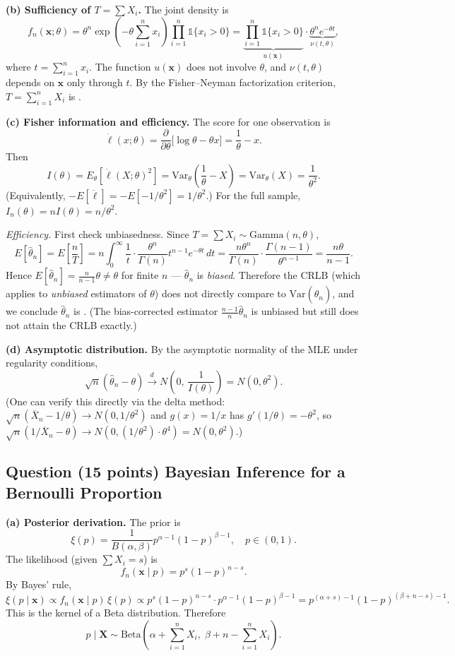 \documentclass[11pt]{article}
\newcounter{qnum}
\newcommand{\question}[2]{\stepcounter{qnum}\subsection*{Question \theqnum \quad (#1 points) \hfill #2}}
\begin{document}
\textbf{(b) Sufficiency of $T = \sum X_i$.} The joint density is
\[ f_n(\mathbf{x};\theta) = \theta^n \exp\!\left(-\theta\sum_{i=1}^n x_i\right)\prod_{i=1}^n \mathbb{1}\{x_i > 0\}
= \underbrace{\prod_{i=1}^n \mathbb{1}\{x_i > 0\}}_{u(\mathbf{x})} \cdot \underbrace{\theta^n e^{-\theta t}}_{\nu(t,\theta)}, \]
where $t = \sum_{i=1}^n x_i$. The function $u(\mathbf{x})$ does not involve $\theta$, and $\nu(t,\theta)$ depends on $\mathbf{x}$ only through $t$. By the Fisher--Neyman factorization criterion, $T = \sum_{i=1}^n X_i$ is .

\textbf{(c) Fisher information and efficiency.} The score for one observation is
\[ \dot\ell(x;\theta) = \frac{\partial}{\partial\theta}\bigl[\log\theta - \theta x\bigr] = \frac{1}{\theta} - x. \]
Then
\[ I(\theta) = E_\theta[\dot\ell(X;\theta)^2] = \mathrm{Var}_\theta\!\left(\frac{1}{\theta} - X\right) = \mathrm{Var}_\theta(X) = \frac{1}{\theta^2}. \]
(Equivalently, $-E[\ddot\ell] = -E[-1/\theta^2] = 1/\theta^2$.) For the full sample, $I_n(\theta) = n I(\theta) = \boxed{n/\theta^2}$.

\emph{Efficiency.} First check unbiasedness. Since $T = \sum X_i \sim \mathrm{Gamma}(n,\theta)$,
\[ E[\hat\theta_n] = E\!\left[\frac{n}{T}\right] = n \int_0^\infty \frac{1}{t} \cdot \frac{\theta^n}{\Gamma(n)} t^{n-1} e^{-\theta t}\,dt = \frac{n\theta^n}{\Gamma(n)} \cdot \frac{\Gamma(n-1)}{\theta^{n-1}} = \frac{n\theta}{n-1}. \]
Hence $E[\hat\theta_n] = \tfrac{n}{n-1}\theta \neq \theta$ for finite $n$ --- $\hat\theta_n$ is \emph{biased}. Therefore the CRLB (which applies to \emph{unbiased} estimators of $\theta$) does not directly compare to $\mathrm{Var}(\hat\theta_n)$, and we conclude $\hat\theta_n$ is . (The bias-corrected estimator $\tfrac{n-1}{n}\hat\theta_n$ is unbiased but still does not attain the CRLB exactly.)

\textbf{(d) Asymptotic distribution.} By the asymptotic normality of the MLE under regularity conditions,
\[ \boxed{\sqrt{n}(\hat\theta_n - \theta) \xrightarrow{d} N\!\left(0,\, \frac{1}{I(\theta)}\right) = N(0, \theta^2).} \]
(One can verify this directly via the delta method: $\sqrt{n}(\overline{X}_n - 1/\theta) \to N(0, 1/\theta^2)$ and $g(x) = 1/x$ has $g'(1/\theta) = -\theta^2$, so $\sqrt{n}(1/\overline{X}_n - \theta) \to N(0, (1/\theta^2)\cdot \theta^4) = N(0,\theta^2)$.)

\question{15}{Bayesian Inference for a Bernoulli Proportion}

\textbf{(a) Posterior derivation.} The prior is
\[ \xi(p) = \frac{1}{B(\alpha,\beta)} p^{\alpha-1}(1-p)^{\beta-1}, \quad p \in (0,1). \]
The likelihood (given $\sum X_i = s$) is
\[ f_n(\mathbf{x}\mid p) = p^s (1-p)^{n-s}. \]
By Bayes' rule,
\[ \xi(p \mid \mathbf{x}) \propto f_n(\mathbf{x}\mid p)\, \xi(p) \propto p^s(1-p)^{n-s} \cdot p^{\alpha-1}(1-p)^{\beta-1} = p^{(\alpha + s) - 1}(1-p)^{(\beta + n - s) - 1}. \]
This is the kernel of a Beta distribution. Therefore
\[ \boxed{p \mid \mathbf{X} \sim \mathrm{Beta}\!\left(\alpha + \textstyle\sum_{i=1}^n X_i,\; \beta + n - \textstyle\sum_{i=1}^n X_i\right).} \]
\end{document}
